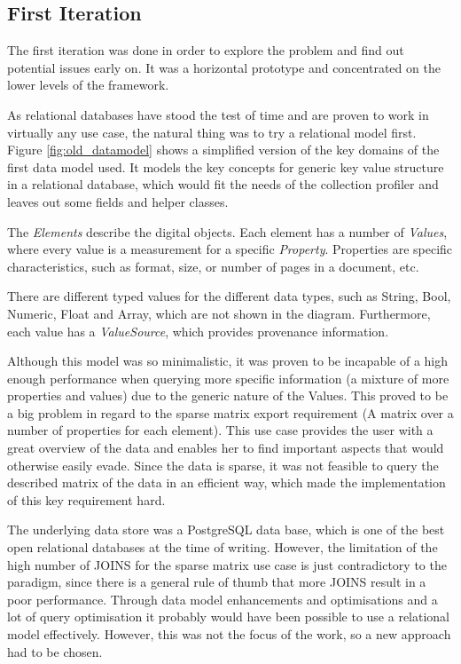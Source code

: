 \subsection{First Iteration}
The first iteration was done in order to explore the problem and find out potential issues early on. It was a horizontal prototype and concentrated on the lower levels of the framework.

As relational databases have stood the test of time and are proven to work in virtually any use case, the natural thing was to try a relational model first. Figure \ref{fig:old_datamodel} shows a simplified version of the key domains of the first data model used. It models the key concepts for generic key value structure in a relational database, which would fit the needs of the collection profiler and leaves out some fields and helper classes. 

The \textit{Elements} describe the digital objects. Each element has a number of \textit{Values}, where every value is a measurement for a specific \textit{Property}. Properties are specific characteristics, such as format, size, or number of pages in a document, etc. 

There are different typed values for the different data types, such as String, Bool, Numeric, Float and Array, which are not shown in the diagram. Furthermore, each value has a \textit{ValueSource}, which provides provenance information.

Although this model was so minimalistic, it was proven to be incapable of a high enough performance when querying more specific information (a mixture of more properties and values) due to the generic nature of the Values. This proved to be a big problem in regard to the sparse matrix export requirement (A matrix over a number of properties for each element). This use case provides the user with a great overview of the data and enables her to find important aspects that would otherwise easily evade. Since the data is sparse, it was not feasible to query the described matrix of the data in an efficient way, which made the implementation of this key requirement hard.

The underlying data store was a PostgreSQL data base, which is one of the best open relational databases at the time of writing. However, the limitation of the high number of JOINS for the sparse matrix use case is just contradictory to the paradigm, since there is a general rule of thumb that more JOINS result in a poor performance. Through data model enhancements and optimisations and a lot of query optimisation it probably would have been possible to use a relational model effectively. However, this was not the focus of the work, so a new approach had to be chosen.

